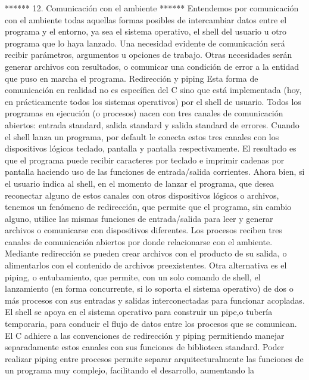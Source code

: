 



****** 12. Comunicación con el ambiente ******
Entendemos por comunicación con el ambiente todas aquellas formas posibles de
intercambiar datos entre el programa y el entorno, ya sea el sistema operativo,
el shell del usuario u otro programa que lo haya lanzado. Una necesidad
evidente de comunicación será recibir parámetros, argumentos u opciones de
trabajo. Otras necesidades serán generar archivos con resultados, o comunicar
una condición de error a la entidad que puso en marcha el programa.
Redirección y piping
Esta forma de comunicación en realidad no es específica del C sino que está
implementada (hoy, en prácticamente todos los sistemas operativos) por el shell
de usuario. Todos los programas en ejecución (o procesos) nacen con tres
canales de comunicación abiertos: entrada standard, salida standard y salida
standard de errores. Cuando el shell lanza un programa, por default le conecta
estos tres canales con los dispositivos lógicos teclado, pantalla y pantalla
respectivamente. El resultado es que el programa puede recibir caracteres por
teclado e imprimir cadenas por pantalla haciendo uso de las funciones de
entrada/salida corrientes.
Ahora bien, si el usuario indica al shell, en el momento de lanzar el programa,
que desea reconectar alguno de estos canales con otros dispositivos lógicos o
archivos, tenemos un fenómeno de redirección, que permite que el programa, sin
cambio alguno, utilice las mismas funciones de entrada/salida para leer y
generar archivos o comunicarse con dispositivos diferentes.
            Los procesos reciben tres canales de comunicación abiertos por donde
 relacionarse con el ambiente. Mediante redirección se pueden crear archivos con
           el producto de su salida, o alimentarlos con el contenido de archivos
                                                                  preexistentes.
Otra alternativa es el piping, o entubamiento, que permite, con un solo comando
de shell, el lanzamiento (en forma concurrente, si lo soporta el sistema
operativo) de dos o más procesos con sus entradas y salidas interconectadas
para funcionar acopladas. El shell se apoya en el sistema operativo para
construir un pipe,o tubería temporaria, para conducir el flujo de datos entre
los procesos que se comunican.
El C adhiere a las convenciones de redirección y piping permitiendo manejar
separadamente estos canales con sus funciones de biblioteca standard. Poder
realizar piping entre procesos permite separar arquitecturalmente las funciones
de un programa muy complejo, facilitando el desarrollo, aumentando la
